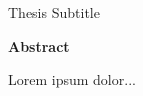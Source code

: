 \thispagestyle{plain}
\makeatletter
\begin{center}
    \Large
    \textbf{\@title}
        
    \vspace{0.4cm}
    \large
    Thesis Subtitle
        
    \vspace{0.4cm}
    \textbf{\@author}
       
    \vspace{0.9cm}
    \textbf{Abstract}
\end{center}
\makeatother

Lorem ipsum dolor...

